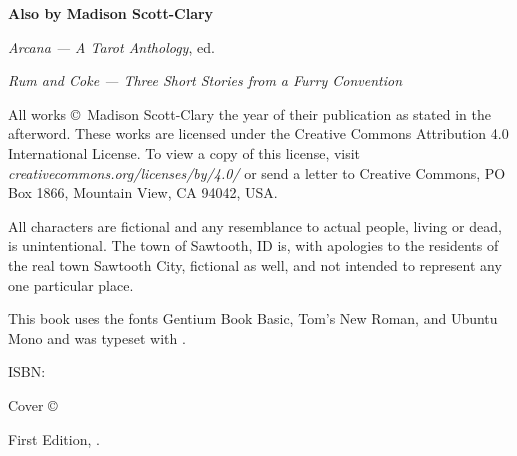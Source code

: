 
\thispagestyle{empty}
\null
\vfill
\begin{center}
    \textbf{Also by Madison Scott-Clary}

    \emph{Arcana --- A Tarot Anthology}, ed.

    \emph{Rum and Coke --- Three Short Stories from a Furry Convention}
\end{center}
\vfill
\singlespacing
{\small\parindent0pt\parskip5pt
\noindent All works \copyright\ Madison Scott-Clary the year of their publication as stated in the afterword. These works are licensed under the Creative Commons Attribution 4.0 International License. To view a copy of this license, visit \mbox{\emph{creativecommons.org/licenses/by/4.0/}} or send a letter to Creative Commons, PO Box 1866, Mountain View, CA 94042, USA.

All characters are fictional and any resemblance to actual people, living or dead, is unintentional. The town of Sawtooth, ID is, with apologies to the residents of the real town Sawtooth City, fictional as well, and not intended to represent any one particular place.

This book uses the fonts Gentium Book Basic, {\TitleFont Tom's New Roman}, and {\MUCKFont Ubuntu Mono} and was typeset with {\XeLaTeX}.

\vspace{1ex}

ISBN: \ISBN

\vspace{1ex}

\emph{\Title}

\vspace{1ex}

Cover \copyright\ \Year\ \Illustrator\\
\IllustratorWeb

\vspace{1ex}

First Edition, \Year.

\EditionsList
}

\cleardoublepage
